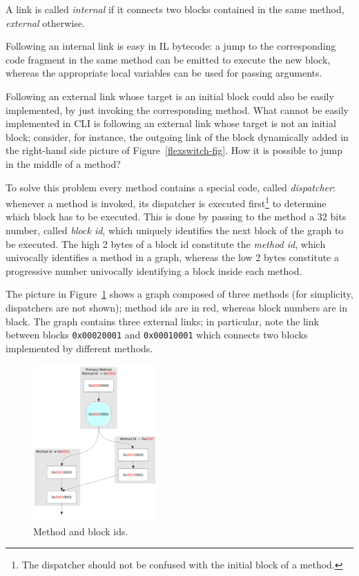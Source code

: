 A link is called \emph{internal} if it connects two blocks contained
in the same method,
\emph{external} otherwise.

Following an internal link is easy in IL bytecode: a jump to
the corresponding code fragment in the same method can be emitted 
to execute the new block, whereas the appropriate local variables can be
used for passing arguments. 

Following an external link whose target is an initial block could also
be easily implemented, by just invoking the corresponding method.
What cannot be easily implemented in CLI is following an external link
whose target is not an initial block; consider, for instance, the
outgoing link of the block dynamically added in the right-hand side
picture of Figure~\ref{flexswitch-fig}. How it is possible to jump in 
the middle of a method?

To solve this problem every method contains a special code, called
\emph{dispatcher}: whenever a method is invoked, its dispatcher is
executed first\footnote{The dispatcher should not be
confused with the initial block of a method.} to
determine which block has to be executed.
This is done by passing to the method a 32 bits number, called 
\emph{block id}, which uniquely identifies the next block of the graph to be executed.
The high 2 bytes of a block id constitute the \emph{method id}, which 
univocally identifies a method in a graph, whereas the low 2 bytes constitute
a progressive number univocally identifying a block inside each method.

The picture in Figure~\ref{block-id-fig} shows a graph composed of three methods (for
simplicity, dispatchers are not shown); method ids are in red, whereas
block numbers are in black. 
The graph contains three external links; in particular, note the link
between blocks \texttt{0x00020001} and \texttt{0x00010001} which
connects two blocks implemented by different methods.
\begin{figure}[h]
\begin{center}
\includegraphics[height=6cm]{blockid}
\caption{Method and block ids.}\label{block-id-fig}
\end{center}
\end{figure}

